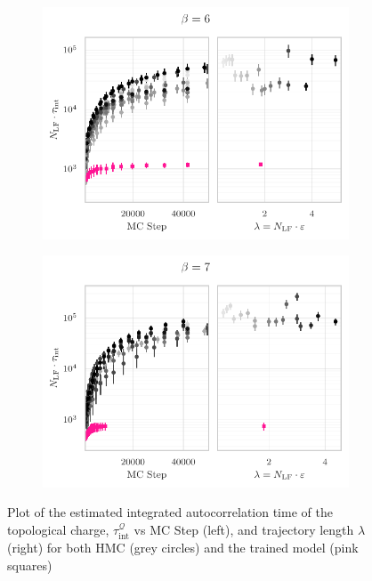 \documentclass{article} %
\begin{document}
%
\begin{figure}[htpb]
   \centering
   \begin{subfigure}{0.45\textwidth}
      \includegraphics[width=\textwidth]{figures/autocorr_plots_2021_03_09/autocorr_vs_traj_len_2152_b6.pdf}
   \end{subfigure}
   \hfill
   \begin{subfigure}{0.45\textwidth}
      \includegraphics[width=\textwidth]{figures/autocorr_plots_2021_03_09/autocorr_vs_traj_len_2152_b7.pdf}
   \end{subfigure}
   \caption{\label{fig:autocorrbeta2}Plot of the estimated integrated autocorrelation time of the topological charge,
      \(\tau_{\mathrm{int}}^{\mathcal{Q}}\) vs MC Step (left), and trajectory length \(\lambda\) (right) for both HMC
   (grey circles) and the trained model (pink squares)}
\end{figure}
%
%
\end{document}
